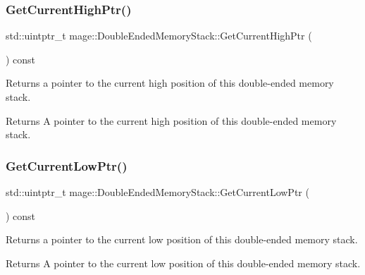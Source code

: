 \subsubsection{\texorpdfstring{Get\+Current\+High\+Ptr()}{GetCurrentHighPtr()}}
{\footnotesize\ttfamily std\+::uintptr\+\_\+t mage\+::\+Double\+Ended\+Memory\+Stack\+::\+Get\+Current\+High\+Ptr (\begin{DoxyParamCaption}{ }\end{DoxyParamCaption}) const\hspace{0.3cm}{\ttfamily [noexcept]}}

Returns a pointer to the current high position of this double-\/ended memory stack.

\begin{DoxyReturn}{Returns}
A pointer to the current high position of this double-\/ended memory stack. 
\end{DoxyReturn}
\mbox{\label{classmage_1_1_double_ended_memory_stack_ac7b5f3ef39129df7461f51c306c585f2}} 
\subsubsection{\texorpdfstring{Get\+Current\+Low\+Ptr()}{GetCurrentLowPtr()}}
{\footnotesize\ttfamily std\+::uintptr\+\_\+t mage\+::\+Double\+Ended\+Memory\+Stack\+::\+Get\+Current\+Low\+Ptr (\begin{DoxyParamCaption}{ }\end{DoxyParamCaption}) const\hspace{0.3cm}{\ttfamily [noexcept]}}

Returns a pointer to the current low position of this double-\/ended memory stack.

\begin{DoxyReturn}{Returns}
A pointer to the current low position of this double-\/ended memory stack. 
\end{DoxyReturn}
\mbox{\label{classmage_1_1_double_ended_memory_stack_a8838d2a8eeaab044fff6bfce4bbaccdc}} 
